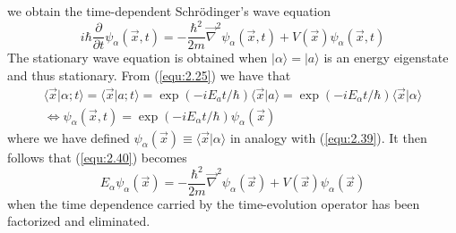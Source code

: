 we obtain the time-dependent Schrödinger's wave equation
\begin{equation}
  i\hbar \frac{\partial}{\partial t}
  \psi_{\alpha}(\vec{x},t) =
  -\frac{\hbar^2}{2m} \vec{\nabla}^2 \psi_{\alpha}
  (\vec{x},t) +
  V(\vec{x}) \psi_{\alpha}(\vec{x},t)
  \label{equ:2.40}
\end{equation}
The stationary wave equation is obtained when $\vert \alpha\rangle  =
\vert a\rangle $ is an energy eigenstate and thus stationary. From
(\ref{equ:2.25}) we have that
\begin{align}
  \langle \vec{x}\vert \alpha;t\rangle  = \langle \vec{x}\vert a;t\rangle  = \exp(-i E_a t/\hbar)
  \langle \vec{x}\vert a\rangle  = \exp(-i E_{\alpha}t /\hbar)
  \langle \vec{x}\vert \alpha\rangle \nonumber\\
  \Leftrightarrow \psi_{\alpha}(\vec{x},t) = \exp(-i
  E_{\alpha} t/\hbar) \psi_{\alpha}(\vec{x})
  \label{equ:2.41}
\end{align}
where we have defined $\psi_{\alpha}(\vec{x}) \equiv
\langle \vec{x}\vert \alpha\rangle $ in analogy with (\ref{equ:2.39}).
It then follows that (\ref{equ:2.40}) becomes
\begin{equation}
  E_{\alpha} \psi_{\alpha} (\vec{x}) = - \frac{\hbar^2}{2m}
  \vec{\nabla}^2 \psi_{\alpha} (\vec{x}) + V(\vec{x})
  \psi_{\alpha} (\vec{x})
  \label{equ:2.42}
\end{equation}
when the time dependence carried by the time-evolution
operator has been factorized and eliminated.
